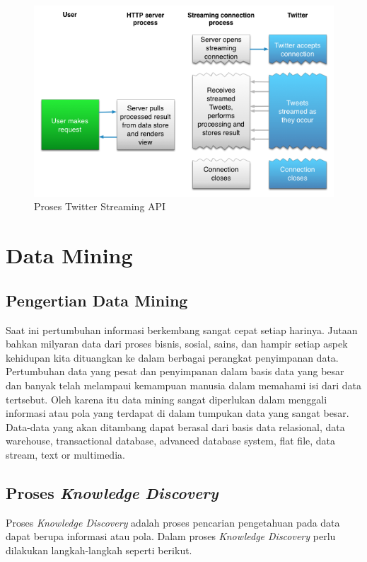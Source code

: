 \begin{figure}
\centering
\includegraphics[scale=0.5]{Gambar/streaming-intro-2_1.png}
\caption[Proses Twitter Streaming API]{Proses Twitter Streaming API \cite{TwitterApi:2015}} 
\end{figure}

\section{Data Mining}
\label{sec:data_mining}
\subsection{Pengertian Data Mining}
Saat ini pertumbuhan informasi berkembang sangat cepat setiap harinya. Jutaan bahkan milyaran data dari proses bisnis, sosial, sains, dan hampir setiap aspek kehidupan kita dituangkan ke dalam berbagai perangkat penyimpanan data. Pertumbuhan data yang pesat dan penyimpanan dalam basis data yang besar dan banyak telah melampaui kemampuan manusia dalam memahami isi dari data tertsebut. Oleh karena itu data mining sangat diperlukan dalam menggali informasi atau pola yang terdapat di dalam tumpukan data yang sangat besar. Data-data yang akan ditambang dapat berasal dari basis data relasional, data warehouse, transactional database, advanced database system, flat file, data stream, text or multimedia. \cite{han2011data} 

\subsection{Proses \textit{Knowledge Discovery}}
Proses \textit{Knowledge Discovery} adalah proses pencarian pengetahuan pada data dapat berupa informasi atau pola. Dalam proses \textit{Knowledge Discovery} perlu dilakukan langkah-langkah seperti berikut.

